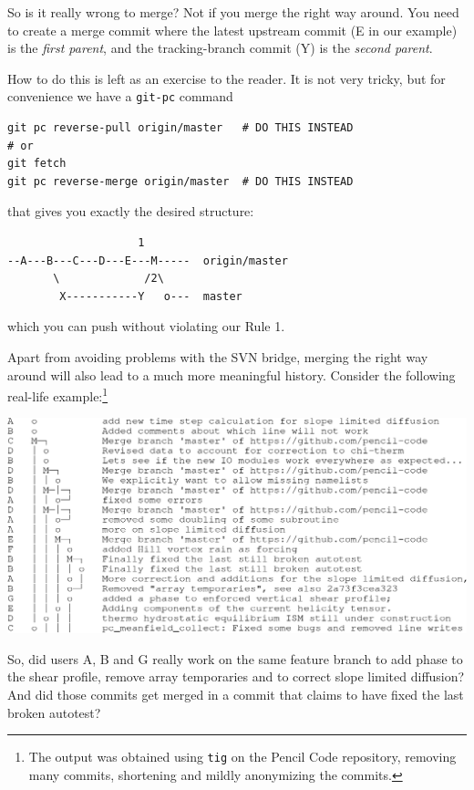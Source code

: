 \documentclass[12pt,pdftex]{article}
\begin{document}
\bigskip

So is it really wrong to merge?
Not if you merge the right way around.
You need to create a merge commit where the latest upstream commit (E
in our example) is the \emph{first parent}, and the tracking-branch commit
(Y) is the \emph{second parent}.

How to do this is left as an exercise to the reader.
It is not very tricky, but for convenience we have a \texttt{git-pc} command
\lstset{frame=single,basicstyle=\ttfamily\footnotesize,language=sh,label= ,caption= ,captionpos=b,numbers=none}
\begin{lstlisting}
git pc reverse-pull origin/master   # DO THIS INSTEAD
# or
git fetch
git pc reverse-merge origin/master  # DO THIS INSTEAD
\end{lstlisting}
that gives you exactly the desired structure:
\begin{verbatim}
                    1
--A---B---C---D---E---M-----  origin/master
       \             /2\
        X-----------Y   o---  master
\end{verbatim}
which you can push without violating our Rule 1.

\bigskip

Apart from avoiding problems with the SVN bridge, merging the right way
around will also lead to a much more meaningful history.
Consider the following real-life example:\footnote{The output was obtained using \texttt{tig} on the Pencil Code repository,
removing many commits, shortening and mildly anonymizing the commits.}

\includegraphics[width=.97\linewidth]{git-wrong-history.pdf}

So, did users A, B and G really work on the same feature branch to add
phase to the shear profile, remove array temporaries and to correct
slope limited diffusion?
And did those commits get merged in a commit that claims to have fixed
the last broken autotest?
\end{document}
